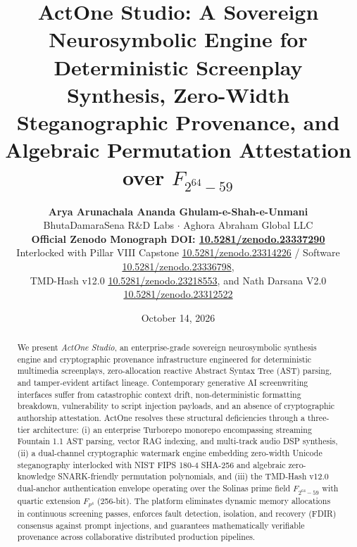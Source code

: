 \documentclass[11pt,a4paper,reqno]{article}
\newcommand{\zenodo}[1]{\href{https://doi.org/10.5281/zenodo.#1}{\texttt{10.5281/\allowbreak zenodo.#1}}}
\def\texttt#1{#1}%
\def\mathbb#1{#1}%
\def\thanks#1{}%
\theoremstyle{plain}
\theoremstyle{definition}
\theoremstyle{remark}
\numberwithin{equation}{section}
\begin{document}
\title{\Large\textbf{ActOne Studio: A Sovereign Neurosymbolic Engine for Deterministic Screenplay Synthesis, Zero-Width Steganographic Provenance, and Algebraic Permutation Attestation over \texorpdfstring{$\mathbb{F}_{2^{64}-59}$}{F(2\textasciicircum 64 - 59)}}}

\author{
  \textbf{Arya Arunachala Ananda Ghulam-e-Shah-e-Unmani}\thanks{Corresponding author. Email: \texttt{research@bhutadamarasena.com}}\\[0.3em]
  \small BhutaDamaraSena R\&D Labs \quad $\cdot$ \quad Aghora Abraham Global LLC\\[0.6em]
  \small \textbf{Official Zenodo Monograph DOI: \zenodo{23337290}}\\[0.2em]
  \small Interlocked with Pillar VIII Capstone \zenodo{23314226} / Software \zenodo{23336798},\\
  \small TMD-Hash v12.0 \zenodo{23218553}, and Nath Darsana V2.0 \zenodo{23312522}
}

\date{October 14, 2026}

\maketitle

\begin{abstract}
\noindent
We present \emph{ActOne Studio}, an enterprise-grade sovereign neurosymbolic synthesis engine and cryptographic provenance infrastructure engineered for deterministic multimedia screenplays, zero-allocation reactive Abstract Syntax Tree (AST) parsing, and tamper-evident artifact lineage. Contemporary generative AI screenwriting interfaces suffer from catastrophic context drift, non-deterministic formatting breakdown, vulnerability to script injection payloads, and an absence of cryptographic authorship attestation. ActOne resolves these structural deficiencies through a three-tier architecture: (i) an enterprise Turborepo monorepo encompassing streaming Fountain 1.1 AST parsing, vector RAG indexing, and multi-track audio DSP synthesis, (ii) a dual-channel cryptographic watermark engine embedding zero-width Unicode steganography interlocked with NIST FIPS 180-4 SHA-256 \cite{fips1804} and algebraic zero-knowledge SNARK-friendly permutation polynomials, and (iii) the TMD-Hash v12.0 dual-anchor authentication envelope operating over the Solinas prime field $\mathbb{F}_{2^{64}-59}$ with quartic extension $\mathbb{F}_{p^4}$ (256-bit). The platform eliminates dynamic memory allocations in continuous screening passes, enforces fault detection, isolation, and recovery (FDIR) consensus against prompt injections, and guarantees mathematically verifiable provenance across collaborative distributed production pipelines.
\end{abstract}
\end{document}
